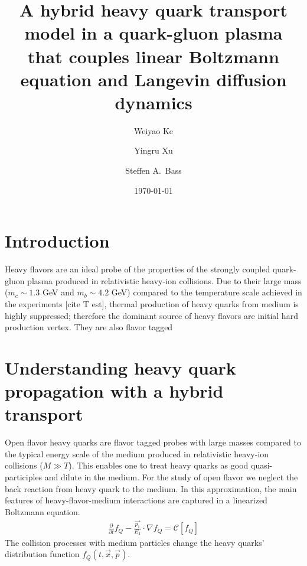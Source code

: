\documentclass[aps, prc, reprint, amsmath, groupedaddress, nofootinbib]{revtex4-1}
\begin{document}
\title{A hybrid heavy quark transport model in a quark-gluon plasma that couples linear Boltzmann equation and Langevin diffusion dynamics}
\author{Weiyao Ke}
\author{Yingru Xu}
\author{Steffen A.\ Bass}
\date{\today}
\maketitle

\section{Introduction}
Heavy flavors are an ideal probe of the properties of the strongly coupled  quark-gluon plasma produced in relativistic heavy-ion collisions. 
Due to their large mass ($m_c\sim 1.3$ GeV and $m_b\sim 4.2$ GeV) compared to the temperature scale achieved in the experiments [cite T est], thermal production of heavy quarks from medium is highly suppressed; therefore the dominant source of heavy flavors are initial hard production vertex.
They are also flavor tagged
\section{Understanding heavy quark propagation with a hybrid transport}
Open flavor heavy quarks are flavor tagged probes with large masses compared to the typical energy scale of the medium produced in relativistic heavy-ion collisions ($M \gg T$).
This enables one to treat heavy quarks as good quasi-participles and dilute in the medium.
For the study of open flavor we neglect the back reaction from heavy quark to the medium. 
In this approximation, the main features of heavy-flavor-medium interactions are captured in a linearized Boltzmann equation.
\begin{eqnarray}
  \frac{\partial}{\partial t}f_Q - \frac{\vec{p_1}}{E_1}\cdot\nabla f_Q  = 
\mathcal{C}[f_Q]
\end{eqnarray}
The collision processes with medium particles change the heavy quarks' distribution function $f_Q(t, \vec{x}, \vec{p})$.
\end{document}
